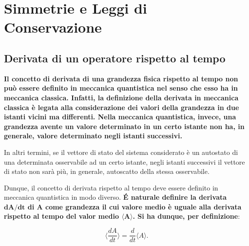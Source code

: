 \documentclass[a4paper,12pt,oneside]{book}
\newcommand*{\myfont}{\fontfamily{ppl}\selectfont}
\begin{document}
\fancypagestyle{plain}{%
\fancyhf{} %
\fancyfoot[C]{\bfseries \myfont{\thepage}} %
\renewcommand{\headrulewidth}{0pt}
\renewcommand{\footrulewidth}{0pt}}

\fancypagestyle{VS}{
\headheight = 15pt
\lhead[\myfont{\textit{\textbf{\thechapter\nouppercase{\leftmark}}}}]{\myfont{\textit{\textbf{\nouppercase{\leftmark}}}}}
\chead[]{}
\rhead[\myfont{\textbf{\thepage}}]{\myfont{\textbf{\thepage}}}

\lfoot[]{}
\cfoot[]{}
\rfoot[]{}
}



\pagestyle{VS}
\setcounter{chapter}{11}
\setcounter{page}{137}
\chapter[Simmetrie e Leggi di Conservazione]{Simmetrie e Leggi di\\ Conservazione} 
\section{Derivata di un operatore rispetto al tempo} 

\textbf{Il concetto di derivata di una grandezza fisica rispetto al tempo non può essere definito in meccanica quantistica nel senso che esso ha in meccanica classica. Infatti, la definizione della derivata in meccanica classica è legata alla considerazione dei valori della grandezza in due istanti vicini ma differenti. Nella meccanica quantistica, invece, una grandezza avente un valore determinato in un certo istante non ha, in generale, valore determinato negli istanti successivi.} 

In altri termini, se il vettore di stato del sistema considerato è un autostato di una determinata osservabile ad un certo istante, negli istanti successivi il vettore di stato non sarà più, in generale, autoscatto della stessa osservabile.

Dunque, il concetto di derivata rispetto al tempo deve essere definito in meccanica quantistica in modo diverso.
\textbf{\'E naturale definire la derivata $\mathbf{dA/dt}$ di A come grandezza il cui valore medio è uguale alla derivata rispetto al tempo del valor medio $\mathbf{\langle A \rangle} $.
Si ha dunque, per definizione}:

\begin{equation}
\langle \frac{dA}{dt} \rangle = \frac{d}{dt} \langle A \rangle .
\end{equation}
\end{document}
